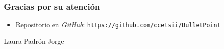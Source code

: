 \begin{frame} [fragile]
  \frametitle{Gracias por su atención}
  \block{\BulletPoint}
    \begin{itemize}
    \item Repositorio en {\it GitHub}: \texttt{https://github.com/ccetsii/BulletPoint}
    \end{itemize}
    \begin{flushright}
    Laura Padrón Jorge  \\
    \end{flushright}
  \endblock{}
\end{frame}
